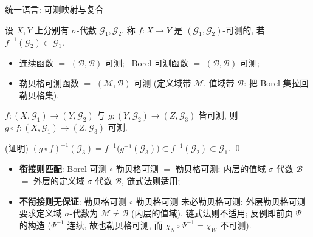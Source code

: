 \begin{frame}{统一语言: 可测映射与复合}

\begin{Def}
设 $X, Y$ 上分别有 $\sigma$-代数 $\mathcal{G}_1, \mathcal{G}_2$. 称 $f: X \to Y$ 是
$(\mathcal{G}_1, \mathcal{G}_2)$-\alert{可测}的, 若 $f^{-1}(\mathcal{G}_2) \subset \mathcal{G}_1$.
\end{Def}

\pause

\begin{itemize}
\item 连续函数 $=$ $(\mathscr{B}, \mathscr{B})$-可测; \ Borel 可测函数 $=$ $(\mathscr{B}, \mathscr{B})$-可测;
\item 勒贝格可测函数 $=$ $(\mathscr{M}, \mathscr{B})$-可测
  (定义域带 $\mathscr{M}$, 值域带 $\mathscr{B}$: 把 Borel 集拉回勒贝格集).
\end{itemize}

\pause

\begin{prop}[链式法则]
$f: (X, \mathcal{G}_1) \to (Y, \mathcal{G}_2)$ 与 $g: (Y, \mathcal{G}_2) \to (Z, \mathcal{G}_3)$
皆可测, 则 $g \circ f: (X, \mathcal{G}_1) \to (Z, \mathcal{G}_3)$ 可测.
\end{prop}

\startproof[bg=yellow, fg=red](证明)
$(g \circ f)^{-1}(\mathcal{G}_3) = f^{-1}\big(g^{-1}(\mathcal{G}_3)\big)
\subset f^{-1}(\mathcal{G}_2) \subset \mathcal{G}_1$.
\qed

\pause

\begin{itemize}
\item \textbf{衔接则匹配}: Borel 可测 $\circ$ 勒贝格可测 $=$ 勒贝格可测:
  内层的值域 $\sigma$-代数 $\mathscr{B}$ $=$ 外层的定义域 $\sigma$-代数 $\mathscr{B}$, 链式法则适用;
\item \textbf{不衔接则无保证}: 勒贝格可测 $\circ$ 勒贝格可测 未必勒贝格可测:
  外层勒贝格可测要求定义域 $\sigma$-代数为 $\mathscr{M} \neq \mathscr{B}$ (内层的值域),
  链式法则不适用; 反例即前页 $\Psi$ 的构造 ($\Psi^{-1}$ 连续, 故也勒贝格可测,
  而 $\chi_S \circ \Psi^{-1} = \chi_W$ 不可测).
\end{itemize}

\end{frame}





